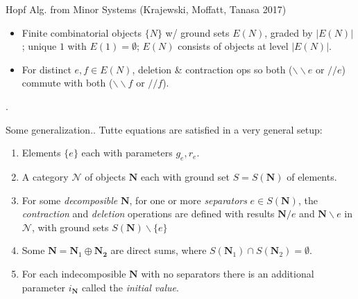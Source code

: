 \documentclass{beamer}
\newcommand{\ext}[1]{\ensuremath{\mathbf{#1}}}
\begin{document}
\begin{frame}{Hopf Alg. from Minor Systems (Krajewski, Moffatt, Tanasa 2017)}
  \begin{definition}
    \begin{itemize}
      \item
    Finite combinatorial objects $\{N\}$  w/ ground sets $E(N)$, graded by
    $|E(N)|$; unique $1$ with $E(1)=\emptyset$; $E(N)$ consists of objects at level $|E(N)|$.
  \item
    For distinct $e,f\in E(N)$, deletion \& contraction ops so both ($\backslash\backslash e$ or $// e$) commute
    with both ($\backslash\backslash f$ or $// f$).
    \end{itemize}.
  \end{definition}


\end{frame}

\begin{frame}{Some generalization..}
  Tutte equations are satisfied in a very general setup:
  \begin{enumerate}
  \item Elements $\{e\}$ each with parameters $g_e, r_e$.
  \item A category $\mathcal{N}$
    of objects $\ext{N}$ each with ground set $S=S(\ext{N})$
    of elements.
  \item For some \emph{decomposible}
    $\ext{N}$, for one or more \emph{separators} $e\in S(\ext{N})$, the
    \emph{contraction} and \emph{deletion} operations are defined with
    results $\ext{N}/e$ and $\ext{N}\backslash e$ in $\mathcal{N}$,
    with ground sets
    $S(\ext{N})\backslash\{e\}$
  \item Some $\ext{N}=\ext{N}_1\oplus\ext{N_2}$ are direct sums, where
    $S(\ext{N}_1)\cap S(\ext{N}_2)=\emptyset$.
  \item For each indecomposible $\ext{N}$ with no separators there is
    an additional parameter $i_{\ext{N}}$ called the \emph{initial value}.
  \end{enumerate}
\end{frame}
\end{document}
